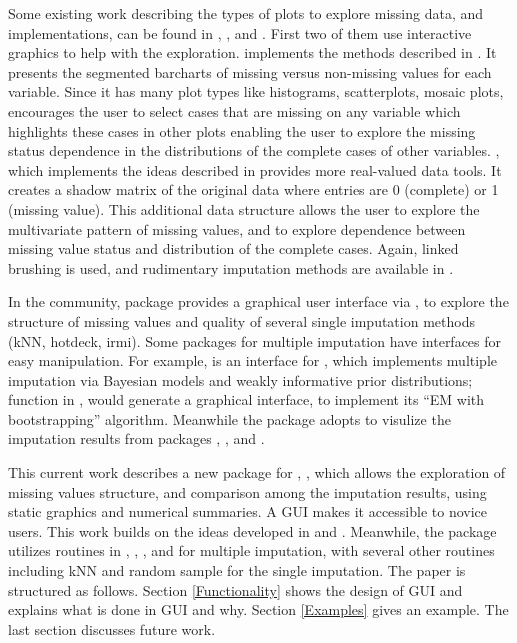 \documentclass[article]{jss}
\begin{document}
Some existing work describing the types of plots to explore missing data, and implementations, can be found in \citet{unwin1996interactive}, \citet{swayne1998missing}, and \citet{templ2008visualization}. First two of them use interactive graphics to help with the exploration.  implements the methods described in \citet{unwin1996interactive}. It presents the segmented barcharts of missing versus non-missing values for each variable. Since it has many plot types like histograms, scatterplots, mosaic plots,  encourages the user to select cases that are missing on any variable which highlights these cases in other plots enabling the user to explore the missing status dependence in the distributions of the complete cases of other variables.  , which implements the ideas described in \citet{swayne1998missing} provides more real-valued data tools. It creates a shadow matrix of the original data where entries are 0 (complete) or 1 (missing value). This additional data structure allows the user to explore the multivariate pattern of missing values, and to explore dependence between missing value status and distribution of the complete cases. Again, linked brushing is used, and rudimentary imputation methods are available in  \citep{STLBC03}.

In the  community, package  \citep{VIM} provides a graphical user interface via  \citep{VIMGUI}, to explore the structure of missing values and quality of several single imputation methods (kNN, hotdeck, irmi). Some packages for multiple imputation have interfaces for easy manipulation. For example,  \citep{migui} is an interface for  \citep{mi}, which implements multiple imputation via Bayesian models and weakly informative prior distributions; function  in  \citep{amelia}, would generate a graphical interface, to implement its ``EM with bootstrapping'' algorithm. Meanwhile the package  \citep{mip} adopts  to visulize the imputation results from packages , , and .

This current work describes a new package for , , which allows the exploration of missing values structure, and comparison among the imputation results, using static graphics and numerical summaries. A GUI makes it accessible to novice users. This work builds on the ideas developed in \citet{unwin1996interactive} and \citet{swayne1998missing}. Meanwhile, the package utilizes routines in , , , and  for multiple imputation, with several other routines including kNN and random sample for the single imputation. The paper is structured as follows. Section \ref{Functionality} shows the design of GUI and explains what is done in GUI and why. Section \ref{Examples} gives an example. The last section discusses future work.
\end{document}
